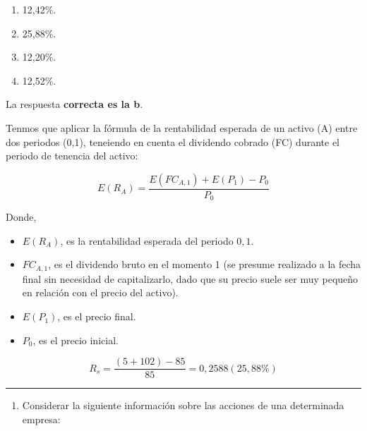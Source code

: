 \documentclass[
  letterpaper,
  DIV=11,
  numbers=noendperiod]{scrreprt}
\providecommand{\tightlist}{%
  \setlength{\itemsep}{0pt}\setlength{\parskip}{0pt}}\usepackage{longtable,booktabs,array}
\begin{document}
\begin{enumerate}
\def\labelenumi{\alph{enumi}.}
\item
  12,42\%.
\item
  25,88\%.
\item
  12,20\%.
\item
  12,52\%.
\end{enumerate}

\begin{tcolorbox}[enhanced jigsaw, left=2mm, opacityback=0, colback=white, breakable, arc=.35mm, bottomrule=.15mm, rightrule=.15mm, toprule=.15mm, leftrule=.75mm, colframe=quarto-callout-tip-color-frame]
\begin{minipage}[t]{5.5mm}
\textcolor{quarto-callout-tip-color}{\faLightbulb}
\end{minipage}%
\begin{minipage}[t]{\textwidth - 5.5mm}

La respuesta \textbf{correcta es la b}.

Tenmos que aplicar la fórmula de la rentabilidad esperada de un activo
(A) entre dos periodos (0,1), teneiendo en cuenta el dividendo cobrado
(FC) durante el periodo de tenencia del activo:

\[E{(R_A)}=\frac{E{(FC_{A,1})}+E(P_1)-P_0}{P_{0}}\]

Donde,

\begin{itemize}
\item
  \(E{(R_A)}\), es la rentabilidad esperada del periodo \(0, 1\).
\item
  \(FC_{A,1}\), es el dividendo bruto en el momento 1 (se presume
  realizado a la fecha final sin necesidad de capitalizarlo, dado que su
  precio suele ser muy pequeño en relación con el precio del activo).
\item
  \(E(P_1)\), es el precio final.
\item
  \(P_{0}\), es el precio inicial.
\end{itemize}

\[R_s=\frac{(5+102)-85}{85}=0,2588(25,88\%)\]

\end{minipage}%
\end{tcolorbox}

\begin{center}\rule{0.5\linewidth}{0.5pt}\end{center}

\begin{enumerate}
\def\labelenumi{\arabic{enumi}.}
\setcounter{enumi}{70}
\tightlist
\item
  Considerar la siguiente información sobre las acciones de una
  determinada empresa:
\end{enumerate}
\end{document}
